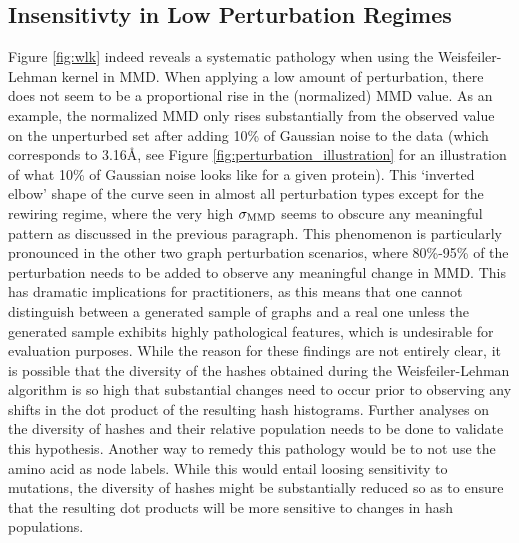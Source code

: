 \subsection{Insensitivty in Low Perturbation Regimes} \label{sec:insensitivity_wl_kernel}
Figure \ref{fig:wlk} indeed reveals a systematic pathology when using the
Weisfeiler-Lehman kernel in MMD. When applying a low amount of perturbation,
there does not seem to be a proportional rise in the (normalized) MMD value. As
an example, the normalized MMD only rises substantially from the observed value
on the unperturbed set after adding 10\% of Gaussian noise to the data (which
corresponds to 3.16\si{\angstrom}, see Figure
\ref{fig:perturbation_illustration} for an illustration of what 10\% of Gaussian
noise looks like for a given protein). This `inverted elbow' shape of the curve
seen in almost all perturbation types except for the rewiring regime, where the
very high $\sigma_{\text{MMD}}$ seems to obscure any meaningful pattern as discussed in
the previous paragraph. This phenomenon is particularly pronounced in the other
two graph perturbation scenarios, where 80\%-95\% of the perturbation needs to
be added to observe any meaningful change in MMD. This has dramatic implications
for practitioners, as this means that one cannot distinguish between a generated
sample of graphs and a real one unless the generated sample exhibits highly
pathological features, which is undesirable for evaluation purposes. While the
reason for these findings are not entirely clear, it is possible that the
diversity of the hashes obtained during the Weisfeiler-Lehman algorithm is so
high that substantial changes need to occur prior to observing any shifts in the
dot product of the resulting hash histograms. Further analyses on the diversity
of hashes and their relative population needs to be done to validate this
hypothesis. Another way to remedy this pathology would be to not use the amino
acid as node labels. While this would entail loosing sensitivity to mutations,
the diversity of hashes might be substantially reduced so as to ensure that the
resulting dot products will be more sensitive to changes in hash populations.




